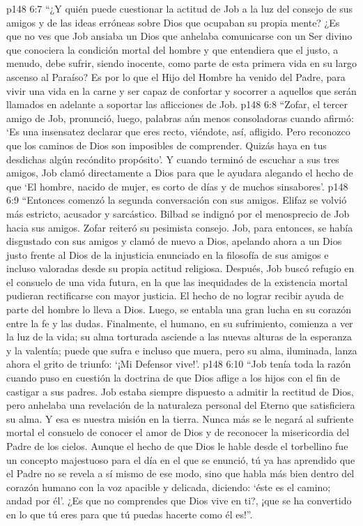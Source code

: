 \vs p148 6:7 “¿Y quién puede cuestionar la actitud de Job a la luz del consejo de sus amigos y de las ideas erróneas sobre Dios que ocupaban su propia mente? ¿Es que no ves que Job ansiaba un Dios  que anhelaba comunicarse con un Ser divino que conociera la condición mortal del hombre y que entendiera que el justo, a menudo, debe sufrir, siendo inocente, como parte de esta primera vida en su largo ascenso al Paraíso? Es por lo que el Hijo del Hombre ha venido del Padre, para vivir una vida en la carne y ser capaz de confortar y socorrer a aquellos que serán llamados en adelante a soportar las aflicciones de Job.
\vs p148 6:8 “Zofar, el tercer amigo de Job, pronunció, luego, palabras aún menos consoladoras cuando afirmó: ‘Es una insensatez declarar que eres recto, viéndote, así, afligido. Pero reconozco que los caminos de Dios son imposibles de comprender. Quizás haya en tus desdichas algún recóndito propósito’. Y cuando terminó de escuchar a sus tres amigos, Job clamó directamente a Dios para que le ayudara alegando el hecho de que ‘El hombre, nacido de mujer, es corto de días y de muchos sinsabores’.
\vs p148 6:9 “Entonces comenzó la segunda conversación con sus amigos. Elifaz se volvió más estricto, acusador y sarcástico. Bilbad se indignó por el menosprecio de Job hacia sus amigos. Zofar reiteró su pesimista consejo. Job, para entonces, se había disgustado con sus amigos y clamó de nuevo a Dios, apelando ahora a un Dios justo frente al Dios de la injusticia enunciado en la filosofía de sus amigos e incluso valoradas desde su propia actitud religiosa. Después, Job buscó refugio en el consuelo de una vida futura, en la que las inequidades de la existencia mortal pudieran rectificarse con mayor justicia. El hecho de no lograr recibir ayuda de parte del hombre lo lleva a Dios. Luego, se entabla una gran lucha en su corazón entre la fe y las dudas. Finalmente, el humano, en su sufrimiento, comienza a ver la luz de la vida; su alma torturada asciende a las nuevas alturas de la esperanza y la valentía; puede que sufra e incluso que muera, pero su alma, iluminada, lanza ahora el grito de triunfo: ‘¡Mi Defensor vive!’.
\vs p148 6:10 “Job tenía toda la razón cuando puso en cuestión la doctrina de que Dios aflige a los hijos con el fin de castigar a sus padres. Job estaba siempre dispuesto a admitir la rectitud de Dios, pero anhelaba una revelación de la naturaleza personal del Eterno que satisficiera su alma. Y esa es nuestra misión en la tierra. Nunca más se le negará al sufriente mortal el consuelo de conocer el amor de Dios y de reconocer la misericordia del Padre de los cielos. Aunque el hecho de que Dios le hable desde el torbellino fue un concepto majestuoso para el día en el que se enunció, tú ya has aprendido que el Padre no se revela a sí mismo de ese modo, sino que habla más bien dentro del corazón humano con la voz apacible y delicada, diciendo: ‘éste es el camino; andad por él’. ¿Es que no comprendes que Dios vive en ti?, ¡que se ha convertido en lo que tú eres para que tú puedas hacerte como él es!”.
